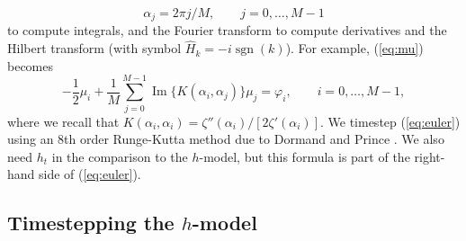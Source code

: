 \documentclass[11pt]{article}
\theoremstyle{plain}
\theoremstyle{definition}
\theoremstyle{definition}
\newcommand{\opn}{\operatorname}
\newcommand{\im}{\opn{Im}}
\begin{document}
%
\begin{equation}
  \alpha_j = 2\pi j/M, \qquad j=0,\dots,M-1
\end{equation}
%
to compute integrals, and the Fourier transform to compute derivatives
and the Hilbert transform (with symbol $\hat H_k =
  -i\opn{sgn}(k)$). For example, (\ref{eq:mu}) becomes
%
\begin{equation}
  -\frac12\mu_i + \frac1M\sum_{j=0}^{M-1}\im\{K(\alpha_i,\alpha_j)\}\mu_j = \varphi_i, \qquad
  i=0,\dots,M-1,
\end{equation}
%
where we recall that $K(\alpha_i,\alpha_i)=\zeta''(\alpha_i)/[2\zeta'(\alpha_i)]$.
We timestep (\ref{eq:euler}) using an 8th order Runge-Kutta method due to
Dormand and Prince \cite{hairer:I,dormand:81}.  We also need $h_t$ in the comparison
to the $h$-model, but this formula is part of the right-hand side of (\ref{eq:euler}).


\subsection{Timestepping the $h$-model}
\end{document}
